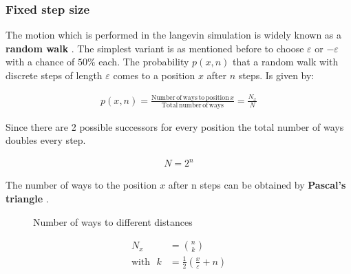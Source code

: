 \documentclass[a4paper, parskip=half]{scrartcl}
\newcommand{\effect}[1]{%
	\textbf{#1}%
}
\begin{document}
\subsubsection{Fixed step size}
The motion which is performed in the langevin simulation is widely known as a \effect{random walk}. The simplest variant is as mentioned before to choose $\varepsilon$ or $-\varepsilon$ with a chance of $50\%$ each. The probability $p(x, n)$ that a random walk with discrete steps of length $\varepsilon$ comes to a position $x$ after $n$ steps. Is given by:

\begin{align}
p(x, n) = \frac{\mathrm{Number\, of\, ways\, to\, position\,} x}{\mathrm{Total\, number\, of\, ways}} = \frac{N_x}{N}
\end{align}

Since there are 2 possible successors for every position the total number of ways  doubles every step.

\begin{align}
N = 2^n
\end{align}

The number of ways to the position $x$ after n steps can be obtained by \effect{Pascal's triangle}.

\begin{figure}[H]
\centering
{}
\caption{Number of ways to different distances}
\end{figure}

\begin{align}
N_x &= \binom{n}{k}\\
\mathrm{with} \, \, \,\, k &= \frac{1}{2}\left(\frac{x}{\varepsilon} + n \right)
\end{align}
\end{document}
